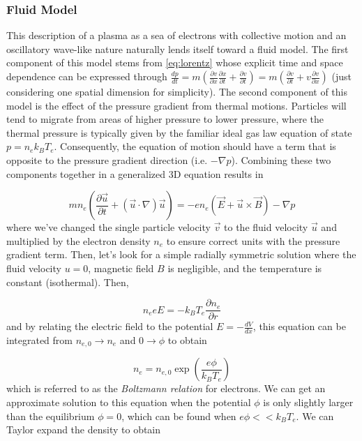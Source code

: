 \subsubsection{Fluid Model}
This description of a plasma as a sea of electrons with collective motion and an oscillatory wave-like nature naturally lends itself toward a fluid model. The first component of this model stems from \cref{eq:lorentz} whose explicit time and space dependence can be expressed through $\frac{d p}{d t} = m (\frac{\partial v}{\partial x} \frac{\partial x}{\partial t} + \frac{\partial v}{\partial t}) = m (\frac{\partial v}{\partial t} + v \frac{\partial v}{\partial x})$ (just considering one spatial dimension for simplicity). The second component of this model is the effect of the pressure gradient from thermal motions. Particles will tend to migrate from areas of higher pressure to lower pressure, where the thermal pressure is typically given by the familiar ideal gas law equation of state $p = n_e k_B T_e$. Consequently, the equation of motion should have a term that is opposite to the pressure gradient direction (i.e. $- \nabla p$). Combining these two components together in a generalized 3D equation results in

\begin{equation}
	m n_e (\frac{\partial \vec{u}}{\partial t} + (\vec{u} \cdot \nabla) \vec{u}) = -e n_e (\vec{E} + \vec{u} \times \vec{B}) - \nabla p \label{eq:fluid}
\end{equation}
where we've changed the single particle velocity $\vec{v}$ to the fluid velocity $\vec{u}$ and multiplied by the electron density $n_e$ to ensure correct units with the pressure gradient term. Then, let's look for a simple radially symmetric solution where the fluid velocity $u = 0$, magnetic field $B$ is negligible, and the temperature is constant (isothermal). Then, 

\begin{equation}
	n_e e E = - k_B T_e \frac{\partial n_e}{\partial r}
\end{equation}
and by relating the electric field to the potential $E = - \frac{dV}{dx}$, this equation can be integrated from $n_{e,0} \rightarrow n_e$ and $0 \rightarrow \phi$ to obtain 

\begin{equation}
	n_e = n_{e,0} \exp(\frac{e \phi}{k_B T_e}) \label{eq:boltzmann}
\end{equation}
which is referred to as the \emph{Boltzmann relation} for electrons\cite{Chen_2015_Plasma}. We can get an approximate solution to this equation when the potential $\phi$ is only slightly larger than the equilibrium $\phi=0$, which can be found when $e \phi << k_B T_e$. We can Taylor expand the density to obtain 

